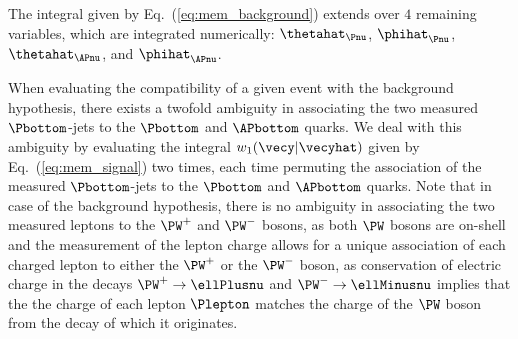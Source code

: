 The integral given by Eq.~(\ref{eq:mem_background}) extends over $4$ remaining variables,
which are integrated numerically: $\thetahat_{\Pnu}$, $\phihat_{\Pnu}$, $\thetahat_{\APnu}$, and $\phihat_{\APnu}$.

When evaluating the compatibility of a given event with the background hypothesis,
there exists a twofold ambiguity in associating the two measured $\Pbottom$-jets to the $\Pbottom$ and $\APbottom$ quarks.
We deal with this ambiguity by evaluating the integral $w_{1}(\vecy|\vecyhat)$ given by Eq.~(\ref{eq:mem_signal}) two times,
each time permuting the association of the measured $\Pbottom$-jets to the $\Pbottom$ and $\APbottom$ quarks.
Note that in case of the background hypothesis, there is no ambiguity in associating the two measured leptons to the $\PW^{+}$ and $\PW^{-}$ bosons,
as both $\PW$ bosons are on-shell and the measurement of the lepton charge allows for a unique association of each charged lepton to either the $\PW^{+}$ or the $\PW^{-}$ boson,
as conservation of electric charge in the decays $\PW^{+} \to \ellPlusnu$ and $\PW^{-} \to \ellMinusnu$ implies that the the charge of each lepton $\Plepton$ matches the charge of the $\PW$ boson
from the decay of which it originates.
